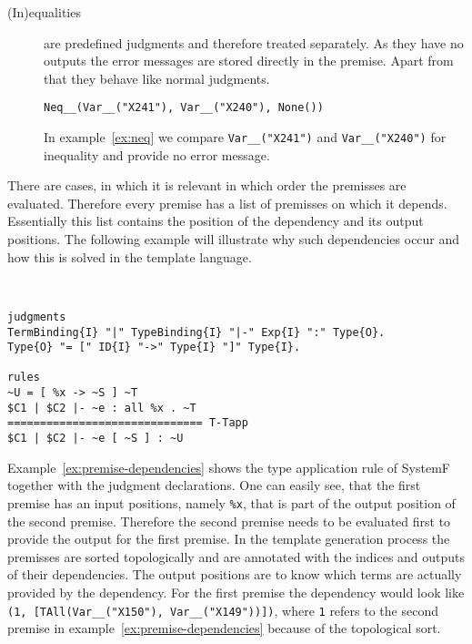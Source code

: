 \begin{description}
\item[(In)equalities] are predefined judgments and therefore treated
  separately. As they have no outputs the error messages are stored
  directly in the premise. Apart from that they behave like normal
  judgments.

\begin{example}
\begin{verbatim}
Neq__(Var__("X241"), Var__("X240"), None())
\end{verbatim}
\label{ex:neq}
\end{example}

  In example~\ref{ex:neq} we compare \verb|Var__("X241")| and
  \verb|Var__("X240")| for inequality and provide no error message.
\end{description}

There are cases, in which it is relevant in which order the premisses
are evaluated. Therefore every premise has a list of premisses on
which it depends. Essentially this list contains the position of the
dependency and its output positions. The following example will
illustrate why such dependencies occur and how this is solved in the
template language.

\begin{example}{~}
\begin{verbatim}
judgments
TermBinding{I} "|" TypeBinding{I} "|-" Exp{I} ":" Type{O}.
Type{O} "= [" ID{I} "->" Type{I} "]" Type{I}.

rules
~U = [ %x -> ~S ] ~T
$C1 | $C2 |- ~e : all %x . ~T 
============================== T-Tapp
$C1 | $C2 |- ~e [ ~S ] : ~U
\end{verbatim}
\label{ex:premise-dependencies}
\end{example}

Example~\ref{ex:premise-dependencies} shows the type application rule
of SystemF  together with the judgment
declarations. One can easily see, that the first premise has an input
positions, namely \verb|%x|, that is part of the output position of
the second premise. Therefore the second premise needs to be evaluated
first to provide the output for the first premise. In the template
generation process the premisses are sorted topologically and are
annotated with the indices and outputs of their dependencies. The
output positions are to know which terms are actually provided by the
dependency. For the first premise the dependency would look like
\verb|(1, [TAll(Var__("X150"), Var__("X149"))])|, where \verb|1|
refers to the second premise in example~\ref{ex:premise-dependencies}
because of the topological sort.

